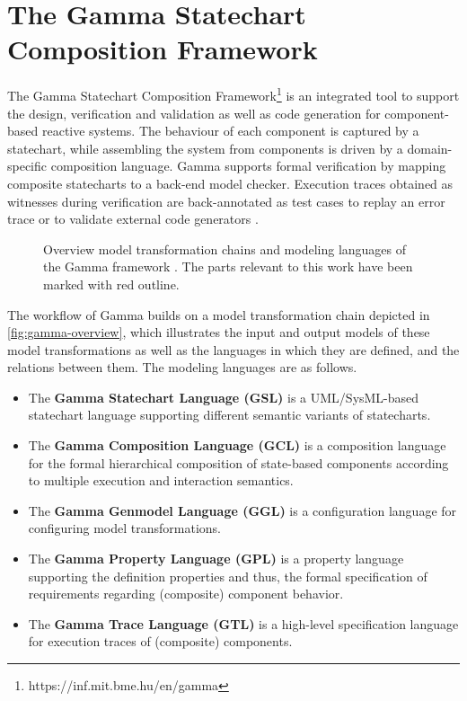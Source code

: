 \section{The Gamma Statechart Composition Framework}\label{sec:gamma}

The Gamma Statechart Composition Framework\footnote{https://inf.mit.bme.hu/en/gamma} \cite{mixed_statecharts_2020} is an integrated tool to support the design, verification and validation as well as code generation for component-based reactive systems. The behaviour of each component is captured by a statechart, while assembling the system from components is driven by a domain-specific composition language. Gamma supports formal verification by mapping composite statecharts to a back-end model checker. Execution traces obtained as witnesses during verification are back-annotated as test cases to replay an error trace or to validate external code generators \cite{molnar2018gamma}. 

\begin{figure}[!ht]
	\centering
	
	\caption{Overview model transformation chains and modeling languages of the Gamma framework \cite{mixed_statecharts_2020}. The parts relevant to this work have been marked with red outline.}
	\label{fig:gamma-overview}
\end{figure}

The workflow of Gamma builds on a model transformation chain depicted in \autoref{fig:gamma-overview}, which illustrates the input and output models of these model transformations as well as the languages in which they are defined, and the relations between them. The modeling languages are as follows.

\begin{itemize}
	\item The \textbf{Gamma Statechart Language (GSL)} is a UML/SysML-based statechart language supporting different semantic variants of statecharts.
	\item The \textbf{Gamma Composition Language (GCL)} is a composition language for the formal hierarchical composition of state-based 	components according to multiple execution and interaction semantics.
	\item The \textbf{Gamma Genmodel Language (GGL)} is a configuration language for configuring model transformations.
	\item The \textbf{Gamma Property Language (GPL)} is a property language supporting the definition properties and thus, the formal specification of requirements regarding (composite)	component behavior.
	\item The \textbf{Gamma Trace Language (GTL)} is a high-level specification language for  execution traces of (composite) components.
\end{itemize}

